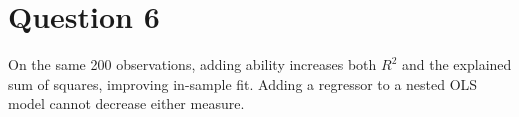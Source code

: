 \section*{Question 6}

On the same 200 observations, adding ability increases both $R^2$ and
the explained sum of squares, improving in-sample fit. Adding a regressor
to a nested OLS model cannot decrease either measure.
